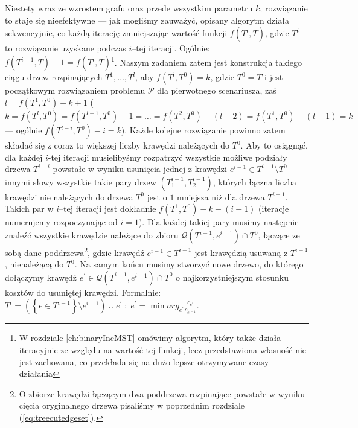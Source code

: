 Niestety wraz ze wzrostem grafu oraz przede wszystkim parametru $k$, rozwiązanie to staje się nieefektywne --- jak mogliśmy zauważyć, opisany algorytm działa sekwencyjnie, co każdą iterację zmniejszając wartość funkcji $f \left( T^{i}, T \right)$, gdzie $T^{i}$ to rozwiązanie uzyskane podczas $i$--tej iteracji. Ogólnie: $f \left( T^{i-1}, T \right) - 1 = f \left( T^{i}, T \right)$\footnote{W rozdziale \ref{ch:binaryIncMST} omówimy algorytm, który także działa iteracyjnie ze względu na wartość tej funkcji, lecz przedstawiona własność nie jest zachowana, co przekłada się na dużo lepsze otrzymywane czasy działania}. Naszym zadaniem zatem jest konstrukcja takiego ciągu drzew rozpinających $T^{1}, \dots, T^{l}$, aby $f \left( T^{l}, T^{0} \right) = k$, gdzie $T^{0} = T$ i jest początkowym rozwiązaniem problemu $\mathcal{P}$ dla pierwotnego scenariusza, zaś $l = f \left( T^{1}, T^{0} \right) - k + 1$ ($k = f \left( T^{l}, T^{0} \right) = f \left( T^{l-1}, T^{0} \right) - 1 = \dots =  f \left( T^{2}, T^{0} \right) - \left( l - 2 \right) = f \left( T^{1}, T^{0} \right) - \left( l - 1 \right) = k$ --- ogólnie $f \left( T^{l - i}, T^{0} \right) - i = k$). Każde kolejne rozwiązanie powinno zatem składać się z coraz to większej liczby krawędzi należących do $T^{0}$. Aby to osiągnąć, dla każdej $i$-tej iteracji musielibyśmy rozpatrzyć wszystkie możliwe podziały drzewa $T^{i-i}$ powstałe w wyniku usunięcia jednej z krawędzi $e^{i-1} \in T^{i-1} \setminus T^{0}$ --- innymi słowy wszystkie takie pary drzew $\left( T^{i-1}_{1}, T^{i-1}_{2} \right)$, których łączna liczba krawędzi nie należących do drzewa $T^{0}$ jest o $1$ mniejsza niż dla drzewa $T^{i-1}$. Takich par w $i$--tej iteracji jest dokładnie $f \left( T^{1}, T^{0} \right) - k - \left( i - 1 \right)$ (iteracje numerujemy rozpoczynając od $i = 1$). Dla każdej takiej pary musimy następnie znaleźć wszystkie krawędzie należące do zbioru $\mathcal{Q} \left( T^{i-1}, e^{i-1} \right) \cap T^{0}$, łączące ze sobą dane poddrzewa\footnote{O zbiorze krawędzi łączącym dwa poddrzewa rozpinające powstałe w wyniku cięcia oryginalnego drzewa pisaliśmy w poprzednim rozdziale (\ref{eq:treecutedgeset}).}, gdzie krawędź $e^{i-1} \in T^{i-1}$ jest krawędzią usuwaną z $T^{i-1}$, nienależącą do $T^{0}$. Na samym końcu musimy stworzyć nowe drzewo, do którego dołączymy krawędź $e^{\prime} \in \mathcal{Q} \left( T^{i-1}, e^{i-1} \right) \cap T^{0}$ o najkorzystniejszym stosunku kosztów do usuniętej krawędzi. Formalnie: $T^{i} = \left( \left\{ e \in T^{i-1} \right\} \setminus e^{i-1} \right) \cup e^{\prime} \; : \; e^{\prime} = \min arg_{e^{\prime}} \frac{c_{e^{\prime}}}{c_{e^{i-1}}}$. 

